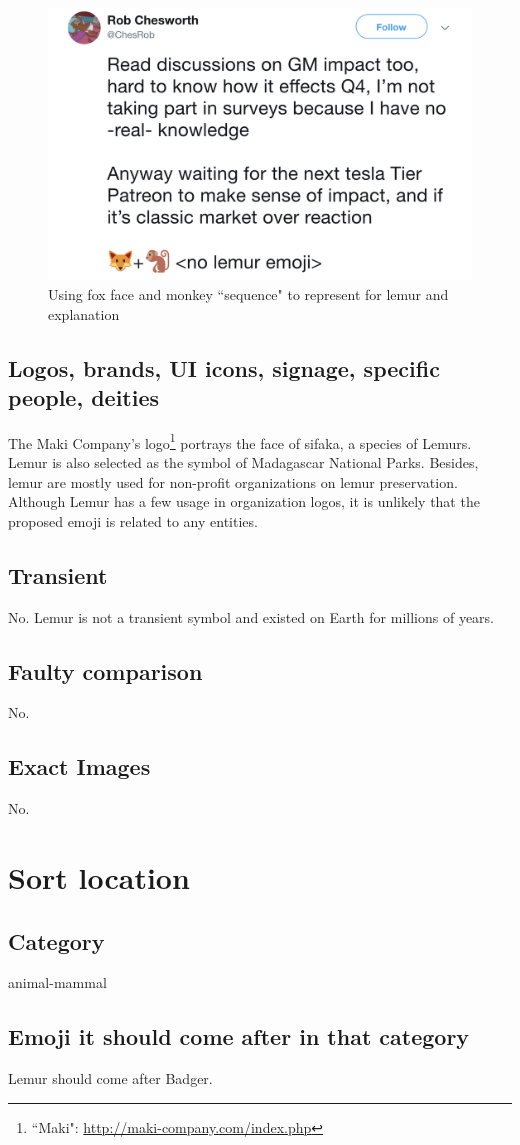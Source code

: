 \documentclass{article}
\begin{document}
\begin{figure}
  \includegraphics[width=\linewidth]{img/fox-face-monkey-emoji-substitute-tweet.png}
  \caption{Using fox face and monkey ``sequence" to represent for lemur and explanation\protect\footnotemark}
  \label{fig:fox-face-monkey-emoji-substitute-tweet}
\end{figure}

\subsection{Logos, brands, UI icons, signage, specific people, deities}
The Maki Company's logo\footnote{``Maki": \url{http://maki-company.com/index.php}} portrays the face of sifaka, a species of Lemurs. Lemur is also selected as the symbol of Madagascar National Parks. Besides, lemur are mostly used for non-profit organizations on lemur preservation. Although Lemur has a few usage in organization logos, it is unlikely that the proposed emoji is related to any entities.

\subsection{Transient}
No. Lemur is not a transient symbol and existed on Earth for millions of years.

\subsection{Faulty comparison}
No.

\subsection{Exact Images}
No.

\section{Sort location}
\subsection{Category} animal-mammal

\subsection{Emoji it should come after in that category} Lemur should come after Badger.
 
\end{document}
